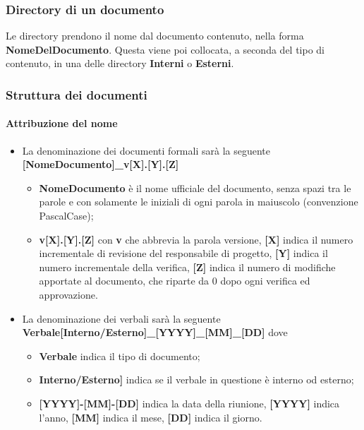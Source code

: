 \subsubsection{Directory di un documento}
Le directory prendono il nome dal documento contenuto, nella forma \textbf{NomeDelDocumento}.  Questa viene poi collocata,  a seconda del tipo di contenuto,  in una delle directory \textbf{Interni} o \textbf{Esterni}. 
\subsubsection{Struttura dei documenti}
\paragraph{Attribuzione del nome}
\begin{itemize}
	\item La denominazione dei documenti formali sarà la seguente \newline
	\textbf{[NomeDocumento]\_v[X].[Y].[Z]}
	\begin{itemize}
		\item \textbf{NomeDocumento} è il nome ufficiale del documento, senza spazi tra le parole e con solamente le iniziali di ogni parola in maiuscolo (convenzione PascalCase);
		\item \textbf{v[X].[Y].[Z]} con \textbf{v} che abbrevia la parola versione, \textbf{[X]} indica il numero incrementale di revisione del responsabile di progetto, \textbf{[Y]} indica il numero incrementale della verifica, \textbf{[Z]} indica il numero di modifiche apportate al documento, che riparte da 0 dopo ogni verifica ed approvazione.
	\end{itemize}
	\item La denominazione dei verbali sarà la seguente\newline
	\textbf{Verbale[Interno/Esterno]\_[YYYY]\_[MM]\_[DD]}\newline
	dove
	\begin{itemize}
		\item \textbf{Verbale} indica il tipo di documento;
		\item \textbf{Interno/Esterno]} indica se il verbale in questione è interno od esterno;
		\item \textbf{[YYYY]-[MM]-[DD]}  indica la data della riunione, \textbf{[YYYY]} indica l'anno, \textbf{[MM]} indica il mese, \textbf{[DD]} indica il giorno.
	\end{itemize}
\end{itemize}
